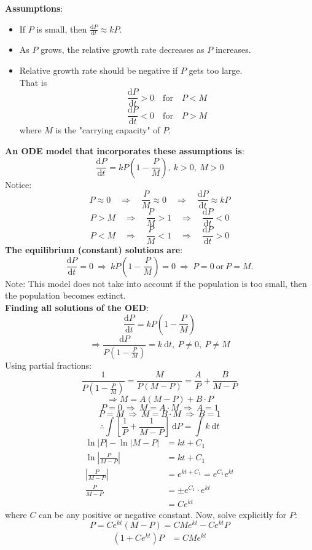 \documentclass[12pt,a4paper]{article}
\def\d{{\mathrm{d}}}
\begin{document}
\begin{enumerate}
	\textbf{Assumptions}: 
	\begin{itemize}
		\item If $P$ is small, then $\displaystyle\frac{\d P}{\d t}\approx kP.$	
		\item As $P$ grows, the relative growth rate decreases as $P$ increases. 
		\item Relative growth rate should be negative if $P$ gets too large. \\
		That is 
		$$\frac{\d P}{\d t}>0\quad\text{for}\quad P<M$$
		$$\frac{\d P}{\d t}<0\quad\text{for}\quad P>M$$
		where $M$ is the "carrying capacity" of $P$.
	\end{itemize}
	\textbf{An ODE model that incorporates these assumptions is}: 
	$$\frac{\d P}{\d t}=kP\left(1-\frac{P}{M}\right),\ k>0,\ M>0$$
	Notice: 
	$$P\approx0\quad\Rightarrow\quad\frac{P}{M}\approx0\quad\Rightarrow\quad\frac{\d P}{\d t}\approx kP$$
	$$P>M\quad\Rightarrow\quad\frac{P}{M}>1\quad\Rightarrow\quad\frac{\d P}{\d t}<0$$
	$$P<M\quad\Rightarrow\quad\frac{P}{M}<1\quad\Rightarrow\quad\frac{\d P}{\d t}>0$$
	\textbf{The equilibrium (constant) solutions are}: 
	$$\frac{\d P}{\d t}=0\ \Longrightarrow\ kP\left(1-\frac{P}{M}\right)=0\ \Rightarrow\ P=0\ \text{or}\ P=M.$$
	Note: This model does not take into account if the population is too small, then the population becomes extinct. \\
	\textbf{Finding all solutions of the OED}: 
	$$\frac{\d P}{\d t}=kP\left(1-\frac{P}{M}\right)$$
	$$\Rightarrow \frac{\d P}{P\left(1-\frac{P}{M}\right)}=k\ \d t,\ P\neq0,\ P\neq M$$
	Using partial fractions: 
	$$\frac{1}{P\left(1-\frac{P}{M}\right)}=\frac{M}{P(M-P)}=\frac{A}{P}+\frac{B}{M-P}$$
	$$\Rightarrow M=A(M-P)+B\cdot P$$
	$$P=0\ \Rightarrow\ M=A\cdot M\ \Rightarrow\ A=1$$
	$$P=M\ \Rightarrow\ M=B\cdot M\ \Rightarrow\ B=1$$
	$$\therefore \int \left[\frac{1}{P}+\frac{1}{M-P}\right]\ \d P=\int k\ \d t$$
	$$\begin{aligned}
		\ln|P|-\ln|M-P|&=kt+C_1\\
		\ln\left|\frac{P}{M-P}\right|&=kt+C_1\\
		\left|\frac{P}{M-P}\right|&=e^{kt+C_1}=e^{C_1}e^{kt}\\
		\frac{P}{M-P}&=\pm e^{C_1}\cdot e^{kt}\\
		&=Ce^{kt}
	\end{aligned}$$
	where $C$ can be any positive or negative constant. 
	Now, solve explicitly for $P$: 
	$$P=Ce^{kt}(M-P)=CMe^{kt}-Ce^{kt}P$$
	$$\begin{aligned}
		\left(1+Ce^{kt}\right)P&=CMe^{kt}\\

\end{aligned}$$
\end{enumerate}
\end{document}
